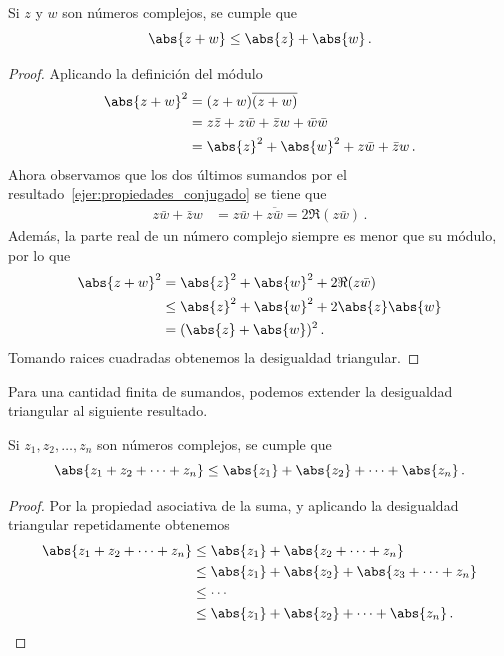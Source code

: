 \begin{theo}
  \label{theo:desigualdad_triangular}
  Si $z$ y $w$ son números complejos, se cumple que
  \[
    \abs{z+w}\leq\abs{z}+\abs{w}\,.
  \]
\end{theo}
\begin{proof}
  Aplicando la definición del módulo
  \begin{align*}
    \abs{z+w}^2 & = (z+w)\overline{(z+w)}                           \\
                & = z\bar{z} + z\bar{w} + \bar{z}w + \bar{w}\bar{w} \\
                & = \abs{z}^2 + \abs{w}^2 + z\bar{w} + \bar{z}w\,.
  \end{align*}
  Ahora observamos que los dos últimos sumandos por el resultado~\ref{ejer:propiedades_conjugado} se tiene que
  \begin{align*}
    z\bar{w} + \bar{z}w & = z\bar{w} + \overline{z\bar{w}} = 2\Re(z\bar{w})\,.
  \end{align*}
  Además, la parte real de un número complejo siempre es menor que su módulo, por lo que
  \begin{align*}
    \abs{z+w}^2 & = \abs{z}^2 + \abs{w}^2 + 2\Re(z\bar{w})     \\
                & \leq \abs{z}^2 + \abs{w}^2 + 2\abs{z}\abs{w} \\
                & = (\abs{z} + \abs{w})^2\,.
  \end{align*}
  Tomando raices cuadradas obtenemos la desigualdad triangular.
\end{proof}

Para una cantidad finita de sumandos, podemos extender la desigualdad triangular al siguiente resultado.

\begin{theo}
  \label{theo:desigualdad_triangular_finita}
  Si $z_1, z_2, \ldots, z_n$ son números complejos, se cumple que
  \[
    \abs{z_1 + z_2 + \cdots + z_n}\leq\abs{z_1} + \abs{z_2} + \cdots + \abs{z_n}\,.
  \]
\end{theo}
\begin{proof}
  Por la propiedad asociativa de la suma, y aplicando la desigualdad triangular repetidamente obtenemos
  \begin{align*}
    \abs{z_1 + z_2 + \cdots + z_n} & \leq \abs{z_1} + \abs{z_2 + \cdots + z_n}             \\
                                   & \leq \abs{z_1} + \abs{z_2} + \abs{z_3 + \cdots + z_n} \\
                                   & \leq \cdots                                           \\
                                   & \leq \abs{z_1} + \abs{z_2} + \cdots + \abs{z_n}\,.
  \end{align*}
\end{proof}

